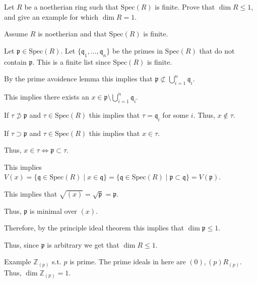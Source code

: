 \documentclass[12pt, letterpaper]{article}
\newcommand{\Z}{\mathbb{Z}}
\newcommand{\p}{\mathfrak{p}}
\newcommand{\Spec}{\mathrm{Spec}}
\newcommand{\mf}[1]{\mathfrak{#1}}
\begin{document}
\color{\TextColor}
\pagecolor{\colormode}
\setlength{\parindent}{0pt}
\pagestyle{fancy}
\fancyhf{}


\begin{problem}{}
    Let $R$ be a noetherian ring such that $\Spec(R)$ is finite. Prove that $\dim R \leq 1$, and give an
example for which $\dim R = 1$.
\end{problem}
\begin{problemproof}
    Assume $R$ is noetherian and that $\Spec(R)$ is finite.

    Let $\p \in \Spec(R)$. Let $\{\mf{q}_1,\dots,\mf{q}_n\}$ be the primes in $\Spec(R)$ that do not contain $\p$.
    This is a finite list since $\Spec(R)$ is finite.

    By the prime avoidence lemma this implies that $\p \nsubset \bigcup_{i=1}^n \mf{q}_i$.

    This implies there exists an $x \in \p \setminus \bigcup_{i=1}^n \mf{q}_i$.

    If $\tau \nsupset \p$ and $\tau \in \Spec(R)$ this implies that $\tau = \mf{q}_i$ for some $i$. Thus, $x \notin \tau$.
    
    If $\tau \supset \p$ and $\tau \in \Spec(R)$ this implies that $x \in \tau$.

    Thus, $x \in \tau \iff \p \subset \tau$.

    This implies $V(x) = \{\mf{q} \in \Spec(R) \mid x \in \mf{q}\} = \{\mf{q} \in \Spec(R) \mid \p \subset \mf{q}\} = V(\p)$.

    This implies that $\sqrt{(x)} = \sqrt{\p} = \p$.

    Thus, $\p$ is minimal over $(x)$.

    Therefore, by the principle ideal theorem this implies that $\dim \p \leq 1$.

    Thus, since $\p$ is arbitrary we get that $\dim R \leq 1$.

    Example $\Z_{(p)}$ s.t. $p$ is prime. The prime ideals in here are $(0),(p)R_{(p)}$. Thus, $\dim \Z_{(p)} = 1$.
\end{problemproof}
\end{document}
